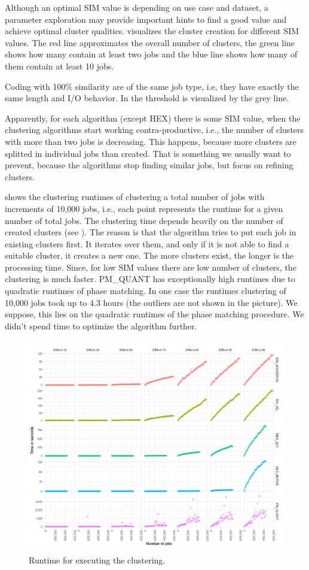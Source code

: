 \documentclass[]{llncs}
\begin{document}
Although an optimal SIM value is depending on use case and dataset, a parameter exploration may provide important hints to find a good value and achieve optimal cluster qualities.
 visualizes the cluster creation for different SIM values.
The red line approximates the overall number of clusters, the green line shows how many contain at least two jobs and the blue line shows how many of them contain at least 10 jobs.

Coding with 100$\%$  similarity are of the same job type, i.e, they have exactly the same length and I/O behavior.
In  the threshold is visualized by the grey line.


Apparently, for each algorithm (except HEX) there is some SIM value, when the clustering algorithms start working contra-productive, i.e., the number of clusters with more than two jobs is decreasing.
This happens, because more clusters are splitted in individual jobs than created.
That is something we usually want to prevent, because the algorithms stop finding similar jobs, but focus on refining clusters.

 shows the clustering runtimes of clustering a total number of jobs with increments of 10,000 jobs, i.e., each point represents the runtime for a given number of total jobs.
The clustering time depends heavily on the number of created clusters (see ).
The reason is that the algorithm tries to put each job in existing clusters first.
It iterates over them, and only if it is not able to find a suitable cluster, it creates a new one.
The more clusters exist, the longer is the processing time.
Since, for low SIM values there are low number of clusters, the clustering is much faster.
PM\_QUANT has exceptionally high runtimes due to quadratic runtimes of phase matching.
In one case the runtimes clustering of 10,000 jobs took up to 4.3 hours (the outliers are not shown in the picture).
We suppose, this lies on the quadratic runtimes of the phase matching procedure.
We didn’t spend time to optimize the algorithm further.

\begin{figure}
  \centering
  \includegraphics[width=4.61in,height=3.68in]{./media/image18.png}
  \caption{Runtime for executing the clustering.}
  \label{fig:alg_runtimes}
\end{figure}
\end{document}
